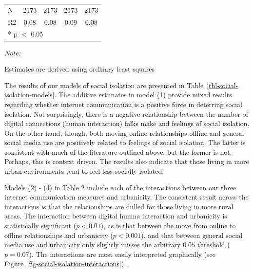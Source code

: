 \documentclass[
  letterpaper,
  DIV=11,
  numbers=noendperiod]{scrartcl}
\begin{document}
\begin{table}
\begin{threeparttable}
\begin{tabular}[t]{lcccc}
\midrule
N & \num{2173} & \num{2173} & \num{2173} & \num{2173}\\
R2 & \num{0.08} & \num{0.08} & \num{0.09} & \num{0.08}\\
\bottomrule
\multicolumn{5}{l}{\rule{0pt}{1em}* p $<$ 0.05}\\
\end{tabular}
\begin{tablenotes}
\item \textit{Note: } 
\item Estimates are derived using ordinary least squares
\end{tablenotes}
\end{threeparttable}
\end{table}

The results of our models of social isolation are presented in
Table~\ref{tbl-social-isolation-models}. The additive estimates in model
(1) provide mixed results regarding whether internet communication is a
positive force in deterring social isolation. Not surprisingly, there is
a negative relationship between the number of digital connections (human
interaction) folks make and feelings of social isolation. On the other
hand, though, both moving online relationships offline and general
social media use are positively related to feelings of social isolation.
The latter is consistent with much of the literature outlined above, but
the former is not. Perhaps, this is context driven. The results also
indicate that those living in more urban environments tend to feel less
socially isolated.

Models (2) - (4) in Table 2 include each of the interactions between our
three internet communication measures and urbanicity. The consistent
result across the interactions is that the relationships are dulled for
those living in more rural areas. The interaction between digital humna
interaction and urbanicity is statistically significant (\(p < 0.01\)),
as is that between the move from online to offline relationships and
urbanicity (\(p < 0.001\)), and that between general social media use
and urbanicity only slightly misses the arbitrary \(0.05\) threshold
(\(p = 0.07\)). The interactions are most easily interpreted graphically
(see Figure~\ref{fig-social-isolation-interactions}).
\end{document}
